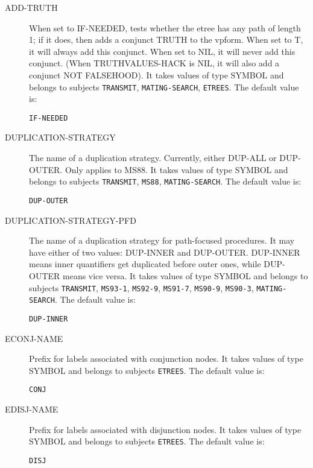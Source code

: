 \begin{description} 
\item[ADD-TRUTH]  
When set to IF-NEEDED, tests whether the etree has any path of 
length 1; if it does, then adds a conjunct TRUTH to the vpform.
When set to T, it will always add this conjunct.
When set to NIL, it will never add this conjunct.
(When TRUTHVALUES-HACK is NIL, it will also add a conjunct NOT FALSEHOOD).
It takes values of type SYMBOL and belongs to subjects \texttt{TRANSMIT}, \texttt{MATING-SEARCH}, \texttt{ETREES}.  The default value is: \begin{lstlisting}
IF-NEEDED
\end{lstlisting}

\item[DUPLICATION-STRATEGY]  
The name of a duplication strategy.  Currently, either
DUP-ALL or DUP-OUTER. Only applies to MS88.
It takes values of type SYMBOL and belongs to subjects \texttt{TRANSMIT}, \texttt{MS88}, \texttt{MATING-SEARCH}.  The default value is: \begin{lstlisting}
DUP-OUTER
\end{lstlisting}

\item[DUPLICATION-STRATEGY-PFD]  
The name of a duplication strategy for path-focused procedures.
It may have either of two values: DUP-INNER and DUP-OUTER. DUP-INNER
means inner quantifiers get duplicated before outer ones, while DUP-OUTER
means vice versa.
It takes values of type SYMBOL and belongs to subjects \texttt{TRANSMIT}, \texttt{MS93-1}, \texttt{MS92-9}, \texttt{MS91-7}, \texttt{MS90-9}, \texttt{MS90-3}, \texttt{MATING-SEARCH}.  The default value is: \begin{lstlisting}
DUP-INNER
\end{lstlisting}

\item[ECONJ-NAME]  
Prefix for labels associated with conjunction nodes.
It takes values of type SYMBOL and belongs to subjects \texttt{ETREES}.  The default value is: \begin{lstlisting}
CONJ
\end{lstlisting}

\item[EDISJ-NAME]  
Prefix for labels associated with disjunction nodes.
It takes values of type SYMBOL and belongs to subjects \texttt{ETREES}.  The default value is: \begin{lstlisting}
DISJ
\end{lstlisting}


\end{description}
